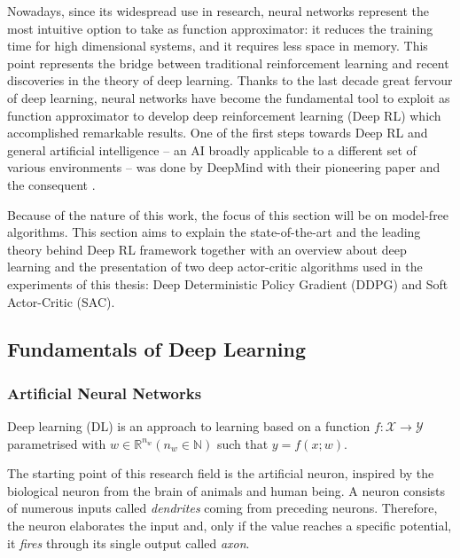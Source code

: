 Nowadays, since its widespread use in research, neural networks represent the most intuitive option to take as function approximator: it reduces the training time for high dimensional systems, and it requires less space in memory.
This point represents the bridge between traditional reinforcement learning and recent discoveries in the theory of deep learning.
Thanks to the last decade great fervour of deep learning, neural networks have become the fundamental tool to exploit as function approximator to develop deep reinforcement learning (Deep RL) which accomplished remarkable results. One of the first steps towards Deep RL and general artificial intelligence -- an AI broadly applicable to a different set of various environments -- was done by DeepMind with their pioneering paper \cite{mnih2013playing} and the consequent \cite{mnih2015human}.

Because of the nature of this work, the focus of this section will be on model-free algorithms.
This section aims to explain the state-of-the-art and the leading theory behind Deep RL framework together with an overview about deep learning and the presentation of two deep actor-critic algorithms used in the experiments of this thesis: Deep Deterministic Policy Gradient (DDPG) and Soft Actor-Critic (SAC).

\subsection{Fundamentals of Deep Learning}

\subsubsection{Artificial Neural Networks}
Deep learning (DL) is an approach to learning based on a function $f: \mathcal{X} \rightarrow \mathcal{Y}$ parametrised with $w \in \mathbb{R}^{n_w} (n_w \in \mathbb{N})$ such that $y = f(x;w)$.

The starting point of this research field is the artificial neuron, inspired by the biological neuron from the brain of animals and human being. A neuron consists of numerous inputs called \textit{dendrites} coming from preceding neurons. Therefore, the neuron elaborates the input and, only if the value reaches a specific potential, it \textit{fires} through its single output called \textit{axon}.

